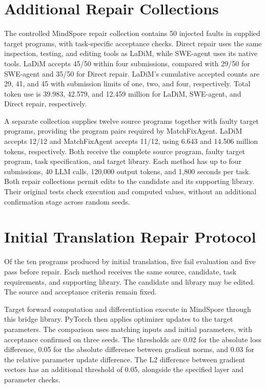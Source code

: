\documentclass{article}
\begin{document}
\section{Additional Repair Collections}
\label{sec:additional-repair}
The controlled MindSpore repair collection contains 50 injected faults in supplied target programs, with task-specific acceptance checks. Direct repair uses the same inspection, testing, and editing tools as LaDiM, while SWE-agent uses its native tools. LaDiM accepts 45/50 within four submissions, compared with 29/50 for SWE-agent and 35/50 for Direct repair. LaDiM's cumulative accepted counts are 29, 41, and 45 with submission limits of one, two, and four, respectively. Total token use is 39.983, 42.579, and 12.459 million for LaDiM, SWE-agent, and Direct repair, respectively.

A separate collection supplies twelve source programs together with faulty target programs, providing the program pairs required by MatchFixAgent. LaDiM accepts 12/12 and MatchFixAgent accepts 11/12, using 6.643 and 14.506 million tokens, respectively. Both receive the complete source program, faulty target program, task specification, and target library. Each method has up to four submissions, 40 LLM calls, 120,000 output tokens, and 1,800 seconds per task. Both repair collections permit edits to the candidate and its supporting library. Their original tests check execution and computed values, without an additional confirmation stage across random seeds.

\section{Initial Translation Repair Protocol}
\label{sec:natural-protocol}
Of the ten programs produced by initial translation, five fail evaluation and five pass before repair. Each method receives the same source, candidate, task requirements, and supporting library. The candidate and library may be edited. The source and acceptance criteria remain fixed.

Target forward computation and differentiation execute in MindSpore through this bridge library. PyTorch then applies optimizer updates to the target parameters. The comparison uses matching inputs and initial parameters, with acceptance confirmed on three seeds. The thresholds are 0.02 for the absolute loss difference, 0.05 for the absolute difference between gradient norms, and 0.03 for the relative parameter update difference. The L2 difference between gradient vectors has an additional threshold of 0.05, alongside the specified layer and parameter checks.
\end{document}
